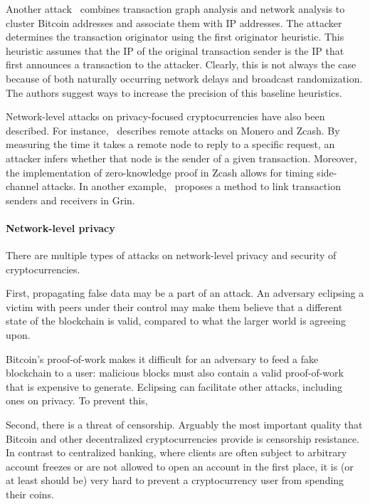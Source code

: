 Another attack~\cite{Neudecker2017} combines transaction graph analysis and network analysis to cluster Bitcoin addresses and associate them with IP addresses.
The attacker determines the transaction originator using the first originator heuristic.
This heuristic assumes that the IP of the original transaction sender is the IP that first announces a transaction to the attacker.
Clearly, this is not always the case because of both naturally occurring network delays and broadcast randomization.
The authors suggest ways to increase the precision of this baseline heuristics.

Network-level attacks on privacy-focused cryptocurrencies have also been described.
For instance,~\cite{Tramer2020} describes remote attacks on Monero and Zcash.
By measuring the time it takes a remote node to reply to a specific request, an attacker infers whether that node is the sender of a given transaction.
Moreover, the implementation of zero-knowledge proof in Zcash allows for timing side-channel attacks.
In another example,~\cite{Bogatyy2019} proposes a method to link transaction senders and receivers in Grin.








\iffalse

\paragraph{Network-level privacy}
There are multiple types of attacks on network-level privacy and security of cryptocurrencies.

First, propagating false data may be a part of an attack.
An adversary eclipsing a victim with peers under their control may make them believe that a different state of the blockchain is valid, compared to what the larger world is agreeing upon.

Bitcoin's proof-of-work makes it difficult for an adversary to feed a fake blockchain to a user: malicious blocks must also contain a valid proof-of-work that is expensive to generate.
Eclipsing can facilitate other attacks, including ones on privacy.
To prevent this, 

Second, there is a threat of censorship.
Arguably the most important quality that Bitcoin and other decentralized cryptocurrencies provide is censorship resistance.
In contrast to centralized banking, where clients are often subject to arbitrary account freezes or are not allowed to open an account in the first place, it is (or at least should be) very hard to prevent a cryptocurrency user from spending their coins.


